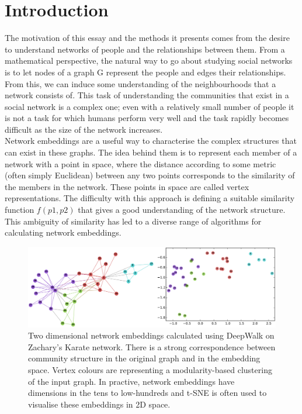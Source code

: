 \documentclass[a4paper]{article}
\begin{document}


\tableofcontents

\section{Introduction}
The motivation of this essay and the methods it presents comes from the desire to understand networks of people and the relationships between them.
From a mathematical perspective, the natural way to go about studying social networks is to let nodes of a graph G represent the people and edges their relationships. From this, we can induce some understanding of the neighbourhoods that a network consists of. This task of understanding the communities that exist in a social network is a complex one; even with a relatively small number of people it is not a task for which humans perform very well and the task rapidly becomes difficult as the size of the network increases.\\
Network embeddings are a useful way to characterise the complex structures that
can exist in these graphs. The idea behind them is to represent each member of a
network with a point in space, where the distance according to some metric
(often simply Euclidean) between any two points corresponds to the similarity of
the members in the network. These points in space are called vertex
representations. The difficulty with this approach is defining a suitable
similarity function $f(p1,p2)$ that gives a good understanding of the network
structure. This ambiguity of similarity has led to a diverse range of algorithms for calculating network embeddings.
\begin{figure}[h!]
  \centering
  \includegraphics[width = 1\textwidth]{src/DeepWalkOnKarateGraph.png}

  \caption{Two dimensional network embeddings calculated using
    DeepWalk on Zachary's Karate network\cite{zachary1977}. There is a strong
    correspondence between community structure in the original graph and
    in the embedding space. Vertex colours are representing a modularity-based
    clustering of the input graph. In practive, network embeddings have dimensions
    in the tens to low-hundreds and t-SNE is often used to visualise these embeddings in 2D
    space.\cite{maaten2008}}
\end{figure}\\
\end{document}
